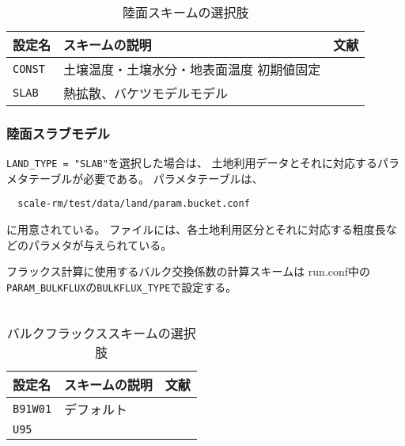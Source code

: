 \begin{table}[h]
\begin{center}
  \caption{陸面スキームの選択肢}
  \label{tab:nml_land}
  \begin{tabularx}{150mm}{llX} \hline
    \rowcolor[gray]{0.9}  設定名 & スキームの説明 & 文献\\ \hline
      \verb|CONST| & 土壌温度・土壌水分・地表面温度 初期値固定 &  \\
      \verb|SLAB|  & 熱拡散、バケツモデルモデル   &  \\
    \hline
  \end{tabularx}
\end{center}
\end{table}



\subsubsection{陸面スラブモデル}
\verb|LAND_TYPE = "SLAB"|を選択した場合は、
土地利用データとそれに対応するパラメタテーブルが必要である。
パラメタテーブルは、
\begin{verbatim}
  scale-rm/test/data/land/param.bucket.conf
\end{verbatim}
に用意されている。
ファイルには、各土地利用区分とそれに対応する粗度長などのパラメタが与えられている。



フラックス計算に使用するバルク交換係数の計算スキームは
run.conf中の\verb|PARAM_BULKFLUX|の\verb|BULKFLUX_TYPE|で設定する。\\

\\

\begin{table}[h]
\begin{center}
  \caption{バルクフラックススキームの選択肢}
  \label{tab:nml_bulk}
  \begin{tabularx}{150mm}{llX} \hline
    \rowcolor[gray]{0.9}  設定名 & スキームの説明 & 文献\\ \hline
      \verb|B91W01| & デフォルト & \citet{beljaars_1991,wilson_2001}\\
      \verb|U95|    &            & \citet{uno_1995}\\
    \hline
  \end{tabularx}
\end{center}
\end{table}




